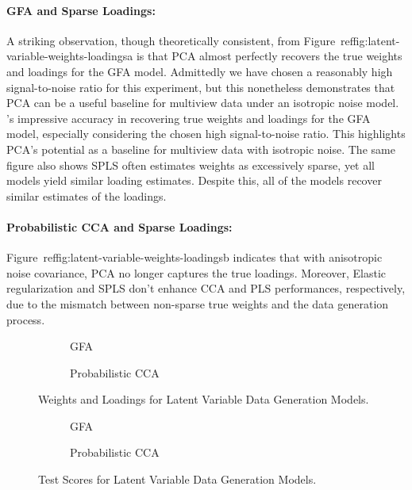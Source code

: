 \paragraph{GFA and Sparse Loadings:} A striking observation, though theoretically consistent, from Figure~ref{fig:latent-variable-weights-loadings}a is that PCA almost perfectly recovers the true weights and loadings for the GFA model.
Admittedly we have chosen a reasonably high signal-to-noise ratio for this experiment, but this nonetheless demonstrates that PCA can be a useful baseline for multiview data under an isotropic noise model.
's impressive accuracy in recovering true weights and loadings for the GFA model, especially considering the chosen high signal-to-noise ratio.
This highlights PCA's potential as a baseline for multiview data with isotropic noise.
The same figure also shows SPLS often estimates weights as excessively sparse, yet all models yield similar loading estimates.
Despite this, all of the models recover similar estimates of the loadings.

\paragraph{Probabilistic CCA and Sparse Loadings:} Figure~ref{fig:latent-variable-weights-loadings}b indicates that with anisotropic noise covariance, PCA no longer captures the true loadings.
Moreover, Elastic regularization and SPLS don't enhance CCA and PLS performances, respectively, due to the mismatch between non-sparse true weights and the data generation process.

\begin{figure}
\centering
\begin{subfigure}{0.49\linewidth}
\centering

\caption{GFA}
\end{subfigure}
%
\begin{subfigure}{0.49\linewidth}
\centering

\caption{Probabilistic CCA}
\end{subfigure}
\caption{Weights and Loadings for Latent Variable Data Generation Models.}\label{fig:latent-variable-weights-loadings}
\end{figure}

\begin{figure}
\centering
\begin{subfigure}{0.49\linewidth}
\centering

\caption{GFA}
\end{subfigure}
%
\begin{subfigure}{0.49\linewidth}
\centering

\caption{Probabilistic CCA}
\end{subfigure}
\caption{Test Scores for Latent Variable Data Generation Models.}\label{fig:latent-variable-scores}
\end{figure}

